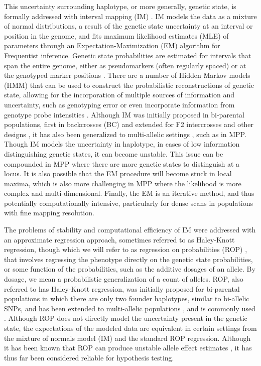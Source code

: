 This uncertainty surrounding haplotype, or more generally, genetic state, is formally addressed with interval mapping (IM) \citep{Lander1989}. IM models the data as a mixture of normal distributions, a result of the genetic state uncertainty at an interval or position in the genome, and fits maximum likelihood estimates (MLE) of parameters through an Expectation-Maximization (EM) algorithm \citep{Dempster1977} for Frequentist inference. Genetic state probabilities are estimated for intervals that span the entire genome, either as pseudomarkers (often regularly spaced) or at the genotyped marker positions \citep{Lander1987}. There are a number of Hidden Markov models (HMM) that can be used to construct the probabilistic reconstructions of genetic state, allowing for the incorporation of multiple sources of information and uncertainty, such as genotyping error \citep{Mott2000,Liu2010,Fu2012,Zheng2015} or even incorporate information from genotype probe intensities \citep{Gatti2014}. Although IM was initially proposed in bi-parental populations, first in backcrosses (BC) \citep{Lander1989} and extended for F2 intercrosses and other designs \citep{Dupuis1999}, it has also been generalized to multi-allelic settings \citep{Liu2000a}, such as in MPP. Though IM models the uncertainty in haplotype, in cases of low information distinguishing genetic states, it can become unstable. This issue can be compounded in MPP where there are more genetic states to distinguish at a locus. It is also possible that the EM procedure will become stuck in local maxima, which is also more challenging in MPP where the likelihood is more complex and  multi-dimensional. Finally, the EM is an iterative method, and thus potentially computationally intensive, particularly for dense scans in populations with fine mapping resolution.

The problems of stability and computational efficiency of IM were addressed with an approximate regression approach, sometimes referred to as Haley-Knott regression, though which we will refer to as regression on probabilities (ROP) \citep{Haley1992,Martinez1992}, that involves regressing the phenotype directly on the genetic state probabilities, or some function of the probabilities, such as the additive dosages of an allele. By dosage, we mean a probabilistic generalization of a count of alleles. ROP, also referred to has Haley-Knott regression, was initially proposed for bi-parental populations in which there are only two founder haplotypes, similar to bi-allelic SNPs, and has been extended to multi-allelic populations \citep{Rebai1993}, and is commonly used \citep{Mott2000, Valdar2006a, Valdar2009, Kover2009, Svenson2012, Gatti2014}. Although ROP does not directly model the uncertainty present in the genetic state, the expectations of the modeled data are equivalent in certain settings from the mixture of normals model (IM) and the standard ROP regression. Although it has been known that ROP can produce unstable allele effect estimates \citep{Zhang2014}, it has thus far been considered reliable for hypothesis testing.

